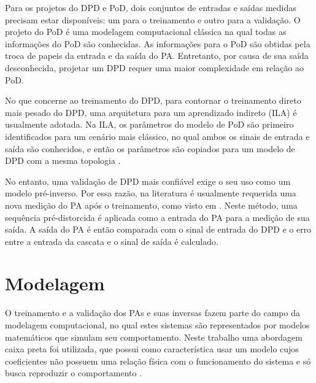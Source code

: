 
Para os projetos do DPD e PoD, dois conjuntos de entradas e saídas medidas precisam estar disponíveis: um para o treinamento e outro para a validação. O projeto do PoD é uma modelagem computacional clássica na qual todas as informações do PoD são conhecidas. As informações para o PoD são obtidas pela troca de papeis da entrada e da saída do PA. Entretanto, por causa de sua saída desconhecida, projetar um DPD requer uma maior complexidade em relação ao PoD.

No que concerne ao treinamento do DPD, para contornar o treinamento direto mais pesado do DPD, uma arquitetura para um aprendizado indireto (ILA) é usualmente adotada. Na ILA, os parâmetros do modelo de PoD são primeiro identificados para um cenário mais clássico, no qual ambos os sinais de entrada e saída são conhecidos, e então os parâmetros são copiados para um modelo de DPD com a mesma topologia \cite{changsoo_eun_new_1997}.

No entanto, uma validação de DPD mais confiável exige o seu uso como um modelo pré-inverso. Por essa razão, na literatura é usualmente requerida uma nova medição do PA após o treinamento, como visto em \cite{8891388}. Neste método, uma sequência pré-distorcida é aplicada como a entrada do PA para a medição de sua saída. A saída do PA é então comparada com o sinal de entrada do DPD e o erro entre a entrada da cascata e o sinal de saída é calculado.

\section{Modelagem} \label{sec:fundteo-model}
O treinamento e a validação dos PAs e suas inversas fazem parte do campo da modelagem computacional, no qual estes sistemas são representados por modelos matemáticos que simulam seu comportamento. Neste trabalho uma abordagem caixa preta foi utilizada, que possui como característica usar um modelo cujos coeficientes não possuem uma relação física com o funcionamento do sistema e só busca reproduzir o comportamento \cite{8882211}.

